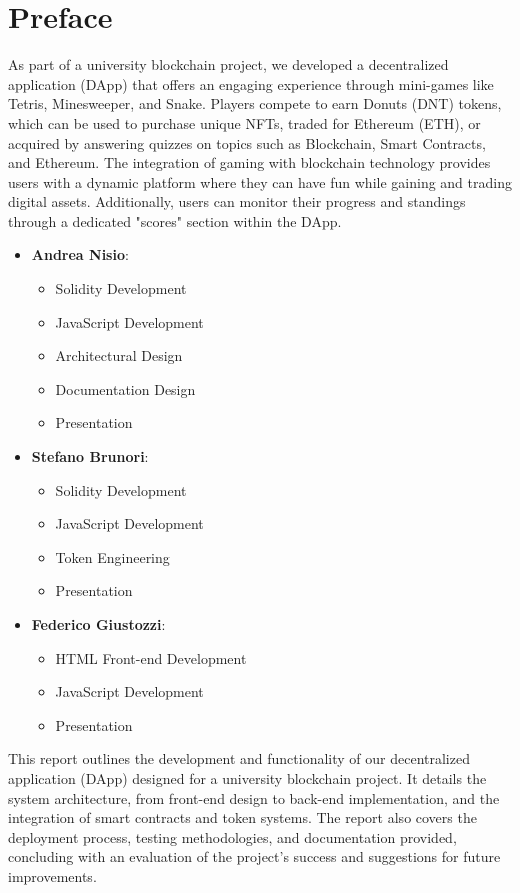 \documentclass[../main.tex]{subfiles}
\begin{document}
\section{Preface}\label{sec:introduction}
As part of a university blockchain project, we developed a decentralized application (DApp) that offers an engaging experience through mini-games like Tetris, 
Minesweeper, and Snake. Players compete to earn Donuts (DNT) tokens, which can be used to purchase unique NFTs, traded for Ethereum (ETH), or acquired by answering 
quizzes on topics such as Blockchain, Smart Contracts, and Ethereum. The integration of gaming with blockchain technology provides users with a dynamic platform where 
they can have fun while gaining and trading digital assets. Additionally, users can monitor their progress and standings through a dedicated "scores" section within 
the DApp.

\begin{itemize}
    \item \textbf{Andrea Nisio}: 
    \begin{itemize}
        \item Solidity Development
        \item JavaScript Development
        \item Architectural Design
        \item Documentation Design
        \item Presentation
    \end{itemize}
    
    \item \textbf{Stefano Brunori}: 
    \begin{itemize}
        \item Solidity Development
        \item JavaScript Development
        \item Token Engineering
        \item Presentation
    \end{itemize}
    
    \item \textbf{Federico Giustozzi}: 
    \begin{itemize}
        \item HTML Front-end Development
        \item JavaScript Development
        \item Presentation
    \end{itemize}
\end{itemize}

This report outlines the development and functionality of our decentralized application (DApp) designed for a university blockchain project. It details the system architecture, from front-end design to back-end implementation, and the integration of smart contracts and token systems. The report also covers the deployment process, testing methodologies, and documentation provided, concluding with an evaluation of the project's success and suggestions for future improvements.
\end{document}
